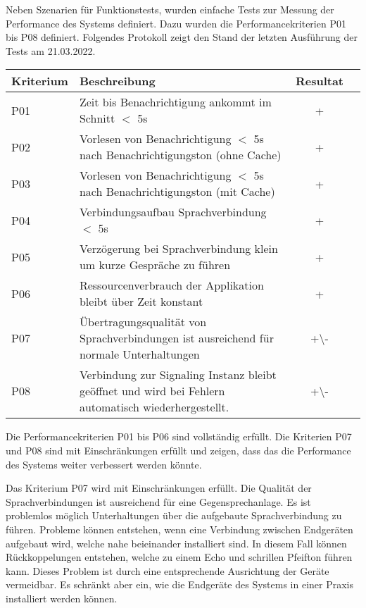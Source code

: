 Neben Szenarien für Funktionstests, wurden einfache Tests zur Messung der Performance des Systems definiert.
Dazu wurden die Performancekriterien P01 bis P08 definiert.
Folgendes Protokoll zeigt den Stand der letzten Ausführung der Tests am 21.03.2022.

\begin{table}[h]
    \centering
    \begin{tabular}{|l|p{11cm}|c|c|}
        \hline
        \textbf{Kriterium} & \textbf{Beschreibung} & \textbf{Resultat} \\
        \hline
        P01         & Zeit bis Benachrichtigung ankommt im Schnitt $<$ 5s & +\\
        \hline
        P02         & Vorlesen von Benachrichtigung $<$ 5s nach Benachrichtigungston (ohne Cache) & +\\
        \hline
        P03         & Vorlesen von Benachrichtigung $<$ 5s nach Benachrichtigungston (mit Cache) & +\\
        \hline
        P04         & Verbindungsaufbau Sprachverbindung $<$ 5s  & +\\
        \hline
        P05         & Verzögerung bei Sprachverbindung klein um kurze Gespräche zu führen & +\\
        \hline
        P06         & Ressourcenverbrauch der Applikation bleibt über Zeit konstant & +\\
        \hline
        P07         & Übertragungsqualität von Sprachverbindungen ist ausreichend für normale Unterhaltungen & +\textbackslash- \\
        \hline
        P08         & Verbindung zur Signaling Instanz bleibt geöffnet und wird bei Fehlern automatisch wiederhergestellt. & +\textbackslash- \\
        \hline
    \end{tabular}\label{tab:testplan_performance}
\end{table}

Die Performancekriterien P01 bis P06 sind vollständig erfüllt.
Die Kriterien P07 und P08 sind mit Einschränkungen erfüllt und zeigen, dass das die Performance des Systems weiter verbessert werden könnte.

Das Kriterium P07 wird mit Einschränkungen erfüllt.
Die Qualität der Sprachverbindungen ist ausreichend für eine Gegensprechanlage.
Es ist problemlos möglich Unterhaltungen über die aufgebaute Sprachverbindung zu führen.
Probleme können entstehen, wenn eine Verbindung zwischen Endgeräten aufgebaut wird, welche nahe beieinander installiert sind.
In diesem Fall können Rückkoppelungen entstehen, welche zu einem Echo und schrillen Pfeifton führen kann.
Dieses Problem ist durch eine entsprechende Ausrichtung der Geräte vermeidbar.
Es schränkt aber ein, wie die Endgeräte des Systems in einer Praxis installiert werden können.

